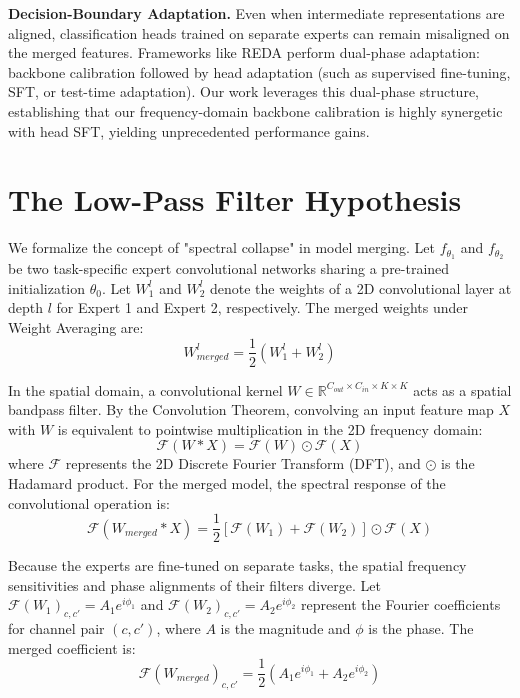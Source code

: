 \documentclass{article}
\begin{document}
\textbf{Decision-Boundary Adaptation.} Even when intermediate representations are aligned, classification heads trained on separate experts can remain misaligned on the merged features. Frameworks like REDA \citep{submission7} perform dual-phase adaptation: backbone calibration followed by head adaptation (such as supervised fine-tuning, SFT, or test-time adaptation). Our work leverages this dual-phase structure, establishing that our frequency-domain backbone calibration is highly synergetic with head SFT, yielding unprecedented performance gains.

\section{The Low-Pass Filter Hypothesis}
\label{sec:hypothesis}
We formalize the concept of "spectral collapse" in model merging. Let $f_{\theta_1}$ and $f_{\theta_2}$ be two task-specific expert convolutional networks sharing a pre-trained initialization $\theta_0$. Let $W^l_1$ and $W^l_2$ denote the weights of a 2D convolutional layer at depth $l$ for Expert 1 and Expert 2, respectively. The merged weights under Weight Averaging are:
\begin{equation}
    W^l_{merged} = \frac{1}{2} (W^l_1 + W^l_2)
\end{equation}

In the spatial domain, a convolutional kernel $W \in \mathbb{R}^{C_{out} \times C_{in} \times K \times K}$ acts as a spatial bandpass filter. By the Convolution Theorem, convolving an input feature map $X$ with $W$ is equivalent to pointwise multiplication in the 2D frequency domain:
\begin{equation}
    \mathcal{F}(W * X) = \mathcal{F}(W) \odot \mathcal{F}(X)
\end{equation}
where $\mathcal{F}$ represents the 2D Discrete Fourier Transform (DFT), and $\odot$ is the Hadamard product. For the merged model, the spectral response of the convolutional operation is:
\begin{equation}
    \mathcal{F}(W_{merged} * X) = \frac{1}{2} \left[ \mathcal{F}(W_1) + \mathcal{F}(W_2) \right] \odot \mathcal{F}(X)
\end{equation}

Because the experts are fine-tuned on separate tasks, the spatial frequency sensitivities and phase alignments of their filters diverge. Let $\mathcal{F}(W_1)_{c,c'} = A_1 e^{i \phi_1}$ and $\mathcal{F}(W_2)_{c,c'} = A_2 e^{i \phi_2}$ represent the Fourier coefficients for channel pair $(c, c')$, where $A$ is the magnitude and $\phi$ is the phase. The merged coefficient is:
\begin{equation}
    \mathcal{F}(W_{merged})_{c,c'} = \frac{1}{2} \left( A_1 e^{i \phi_1} + A_2 e^{i \phi_2} \right)
\end{equation}
\end{document}
